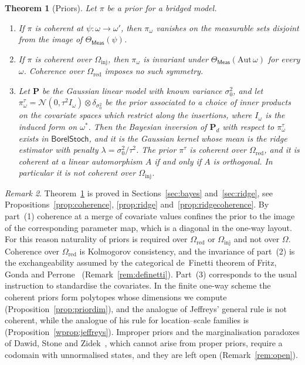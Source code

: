 \documentclass[11pt,a4paper]{article}
\theoremstyle{plain}
\newtheorem{theorem}{Theorem}[section]
\theoremstyle{definition}
\theoremstyle{remark}
\newtheorem{remark}[theorem]{Remark}
\newcommand{\cat}[1]{\mathsf{#1}}
\newcommand{\catO}{\cat{\Omega}}
\newcommand{\Meas}{\cat{Meas}}
\newcommand{\Norm}{\mathcal{N}}
\newcommand{\BorelStoch}{\cat{BorelStoch}}
\begin{document}
\begin{theorem}[Priors]\label{thm:main-priors}
Let $\pi$ be a prior for a bridged model.
\begin{enumerate}
\item If $\pi$ is coherent at $\psi \colon \omega \to \omega'$, then
$\pi_{\omega}$ vanishes on the measurable sets disjoint from the image of
$\Theta_\Meas(\psi)$.
\item If $\pi$ is coherent over $\catO_{\mathrm{inj}}$, then $\pi_{\omega}$ is
invariant under $\Theta_\Meas(\mathrm{Aut}\,\omega)$ for every $\omega$.
Coherence over $\catO_{\mathrm{red}}$ imposes no such symmetry.
\item Let $\mathbf{P}$ be the Gaussian linear model with known variance
$\sigma_{0}^{2}$, and let
$\pi^{\tau}_{\omega} = \Norm(0,\tau^{2}I_{\omega}) \otimes
\delta_{\sigma_{0}^{2}}$ be the prior associated to a choice of inner products
on the covariate spaces which restrict along the insertions, where
$I_{\omega}$ is the induced form on $\omega^{*}$. Then the Bayesian
inversion of $\mathbf{P}_{d}$ with respect to $\pi^{\tau}_{\omega}$ exists in
$\BorelStoch$, and it is the Gaussian kernel whose mean is the ridge estimator
with penalty $\lambda = \sigma_{0}^{2}/\tau^{2}$. The prior $\pi^{\tau}$ is
coherent over $\catO_{\mathrm{red}}$, and it is coherent at a linear
automorphism $A$ if and only if $A$ is orthogonal. In particular it is not
coherent over $\catO_{\mathrm{inj}}$.
\end{enumerate}
\end{theorem}

\begin{remark}\label{rem:main-priors}
Theorem~\ref{thm:main-priors} is proved in Sections~\ref{sec:bayes}
and~\ref{sec:ridge}, see Propositions~\ref{prop:coherence}, \ref{prop:ridge}
and~\ref{prop:ridgecoherence}. By part~(1) coherence at a merge of covariate
values confines the prior to the image of the corresponding parameter map,
which is a diagonal in the one-way layout. For this reason naturality of
priors is required over $\catO_{\mathrm{red}}$ or $\catO_{\mathrm{inj}}$ and
not over $\catO$. Coherence over $\catO_{\mathrm{red}}$ is Kolmogorov consistency, and
the invariance of part~(2) is the exchangeability assumed by the categorical
de~Finetti theorem of Fritz, Gonda and
Perrone~\cite{fritz_definetti_2021} (Remark~\ref{rem:definetti}). Part~(3)
corresponds to the usual instruction to standardise the covariates. In the
finite one-way scheme the coherent priors form polytopes whose dimensions we
compute (Proposition~\ref{prop:priordim}), and the analogue of Jeffreys'
general rule is not coherent, while the analogue of his rule for
location--scale families is (Proposition~\ref{wprop:jeffreys}). Improper
priors and the marginalisation paradoxes of Dawid, Stone and
Zidek~\cite{dawid_stone_zidek_1973}, which cannot arise from proper priors,
require a codomain with unnormalised states, and they are left open
(Remark~\ref{rem:open}).
\end{remark}
\end{document}
